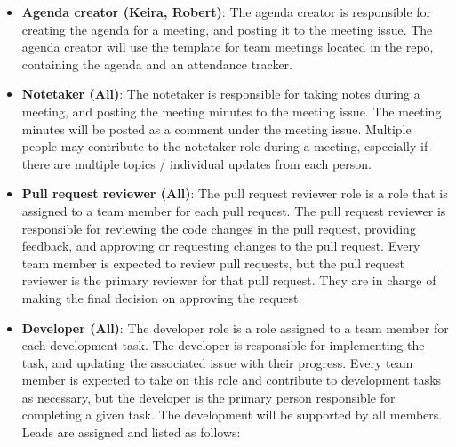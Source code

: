 \documentclass{article}
\begin{document}
\begin{itemize}
  \item \textbf{Agenda creator (Keira, Robert)}: The agenda creator is responsible for creating
  the agenda for a meeting, and posting it to the meeting issue. The agenda creator will 
  use the template for team meetings located in the repo, containing the agenda and an attendance tracker. 
  
  \item \textbf{Notetaker (All)}: The notetaker is responsible for taking notes during a meeting, and posting the meeting minutes to the meeting issue. 
  The meeting minutes will be posted as a comment under the meeting issue. 
  Multiple people may contribute to the notetaker role during a meeting, especially if there are multiple topics / individual updates from each person.
  
  \item \textbf{Pull request reviewer (All)}:
  The pull request reviewer role is a role that is assigned to a team member for each pull request. The pull request reviewer is responsible for reviewing the code changes in the pull request, providing feedback, and approving or requesting changes to the pull request.
  Every team member is expected to review pull requests, but the pull request reviewer is the primary reviewer for that pull request. They are in charge of making the final decision on approving the request. 

  \item \textbf{Developer (All)}: The developer role is a role assigned to a team member for each development task. The developer is responsible for implementing the task, and updating the associated issue with their progress.
  Every team member is expected to take on this role and contribute to development tasks as necessary, but the developer is the primary person responsible for completing a given task. The development will be supported by all members. Leads are assigned and listed as follows:


\end{itemize}
\end{document}
